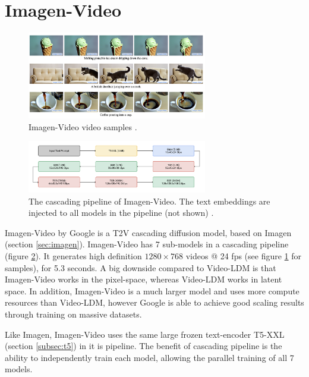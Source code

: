 \section{Imagen-Video}
\label{sec:imagen_video}

\begin{figure}
    \centering
    \includegraphics[width=0.7\textwidth]{images/video_synthesis/imagen_video.png}
    \caption{Imagen-Video video samples \cite{imagen_video}.}
    \label{fig:imagen_video_samples}
\end{figure}

\begin{figure}
    \centering
    \includegraphics[width=0.7\textwidth]{images/imagen_video/pipeline.png}
    \caption{The cascading pipeline of Imagen-Video. The text embeddings are injected to all models in the pipeline (not shown) \cite{imagen_video}.}
    \label{fig:imagen_video_pipeline}
\end{figure}

Imagen-Video by Google \cite{imagen_video} is a T2V cascading diffusion model, based on Imagen (section \ref{sec:imagen}). Imagen-Video has 7 sub-models in a cascading pipeline (figure \ref{fig:imagen_video_pipeline}). It generates high definition $1280\times 768$ videos @ 24 fps (see figure \ref{fig:imagen_video_samples} for samples), for 5.3 seconds. A big downside compared to Video-LDM is that Imagen-Video works in the pixel-space, whereas Video-LDM works in latent space. In addition, Imagen-Video is a much larger model and uses more compute resources than Video-LDM, however Google is able to achieve good scaling results through training on massive datasets.

Like Imagen, Imagen-Video uses the same large frozen text-encoder T5-XXL (section \ref{subsec:t5}) in it is pipeline. The benefit of cascading pipeline is the ability to independently train each model, allowing the parallel training of all 7 models.

